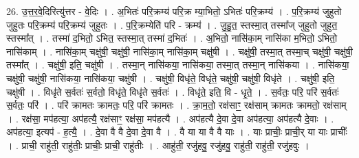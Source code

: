 \documentclass[17pt]{extarticle}
\begin{document}
26. उ॒त्त॒र॒वे॒दिरित्यु॑त्तर - वे॒दिः । . अ॒भितः॑ परि॒क्रम्य॑ परि॒क्र म्या॒भितो॒ ऽभितः॑ परि॒क्रम्य॑ । . प॒रि॒क्रम्य॑ जुहुतो जुहुतः परि॒क्रम्य॑ परि॒क्रम्य॑ जुहुतः । . प॒रि॒क्रम्येति॑ परि - क्रम्य॑ । . जु॒हु॒त॒ स्तस्मा॒त् तस्मा᳚ज् जुहुतो जुहुत॒ स्तस्मा᳚त् । . तस्मा॑ द॒भितो॒ ऽभित॒ स्तस्मा॒त् तस्मा॑ द॒भितः॑ । . अ॒भितो॒ नासि॑का॒म् नासि॑का म॒भितो॒ ऽभितो॒ नासि॑काम् । . नासि॑का॒म् चक्षु॑षी॒ चक्षु॑षी॒ नासि॑का॒म् नासि॑का॒म् चक्षु॑षी । . चक्षु॑षी॒ तस्मा॒त् तस्मा॒च् चक्षु॑षी॒ चक्षु॑षी॒ तस्मा᳚त् । . चक्षु॑षी॒ इति॒ चक्षु॑षी । . तस्मा॒न् नासि॑कया॒ नासि॑कया॒ तस्मा॒त् तस्मा॒न् नासि॑कया । . नासि॑कया॒ चक्षु॑षी॒ चक्षु॑षी॒ नासि॑कया॒ नासि॑कया॒ चक्षु॑षी । . चक्षु॑षी॒ विधृ॑ते॒ विधृ॑ते॒ चक्षु॑षी॒ चक्षु॑षी॒ विधृ॑ते । . चक्षु॑षी॒ इति॒ चक्षु॑षी । . विधृ॑ते स॒र्वतः॑ स॒र्वतो॒ विधृ॑ते॒ विधृ॑ते स॒र्वतः॑ । . विधृ॑ते॒ इति॒ वि - धृ॒ते॒ । . स॒र्वतः॒ परि॒ परि॑ स॒र्वतः॑ स॒र्वतः॒ परि॑ । . परि॑ क्रामतः क्रामतः॒ परि॒ परि॑ क्रामतः । . क्रा॒म॒तो॒ रक्ष॑साꣳ॒॒ रक्ष॑साम् क्रामतः क्रामतो॒ रक्ष॑साम् । . रक्ष॑सा॒ मप॑हत्या॒ अप॑हत्यै॒ रक्ष॑साꣳ॒॒ रक्ष॑सा॒ मप॑हत्यै । . अप॑हत्यै दे॒वा दे॒वा अप॑हत्या॒ अप॑हत्यै दे॒वाः । . अप॑हत्या॒ इत्यप॑ - ह॒त्यै॒ । . दे॒वा वै वै दे॒वा दे॒वा वै । . वै या या वै वै याः । . याः प्राचीः॒ प्राची॒र् या याः प्राचीः᳚ । . प्राची॒ राहु॑ती॒ राहु॑तीः॒ प्राचीः॒ प्राची॒ राहु॑तीः । . आहु॑ती॒ रजु॑हवु॒ रजु॑हवु॒ राहु॑ती॒ राहु॑ती॒ रजु॑हवुः । \newline
\end{document}
